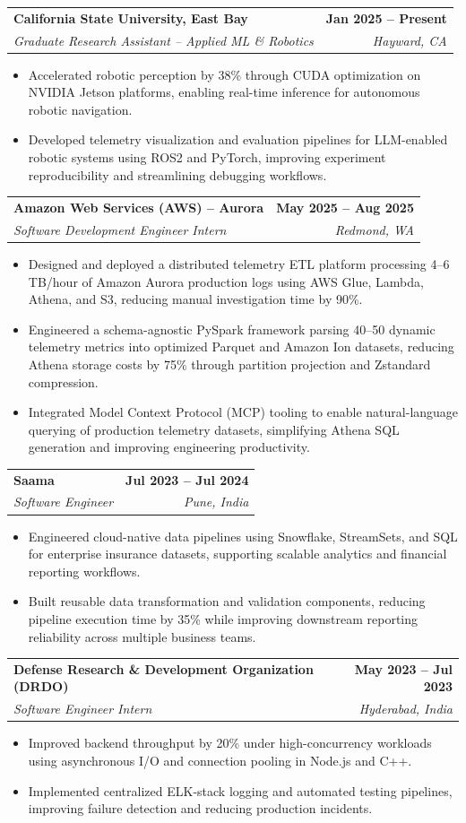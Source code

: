 \documentclass[letterpaper,11pt]{article}
\makeatletter
\newcommand{\subheaderfont}{\fontsize{11.5}{11}\selectfont}
\newcommand{\resumeItem}[1]{
  \item{
    {#1 \vspace{-1pt}}
  }
}
\newcommand{\resumeSubheading}[4]{
  \vspace{1pt}\item
    \begin{tabular*}{1.0\textwidth}[t]{l@{\extracolsep{\fill}}r}
      {\subheaderfont\textbf{#1}} & {\subheaderfont\textbf{#2}} \\
      {\subheaderfont\textit{#3}} & {\subheaderfont\textit{#4}} \\
    \end{tabular*}\vspace{0pt}
}
\newcommand{\resumeItemListStart}{\begin{itemize}}
\newcommand{\resumeItemListEnd}{\end{itemize}\vspace{1pt}}
\makeatother
\begin{document}
    \resumeSubheading
      {California State University, East Bay}{Jan 2025 -- Present}
      {Graduate Research Assistant -- Applied ML \& Robotics}{Hayward, CA}
      \resumeItemListStart
        \resumeItem{Accelerated robotic perception by 38\% through CUDA optimization on NVIDIA Jetson platforms, enabling real-time inference for autonomous robotic navigation.}
        \resumeItem{Developed telemetry visualization and evaluation pipelines for LLM-enabled robotic systems using ROS2 and PyTorch, improving experiment reproducibility and streamlining debugging workflows.}
      \resumeItemListEnd

    \resumeSubheading
      {Amazon Web Services (AWS) -- Aurora}{May 2025 -- Aug 2025}
      {Software Development Engineer Intern}{Redmond, WA}
      \resumeItemListStart
        \resumeItem{Designed and deployed a distributed telemetry ETL platform processing 4--6 TB/hour of Amazon Aurora production logs using AWS Glue, Lambda, Athena, and S3, reducing manual investigation time by 90\%.}
        \resumeItem{Engineered a schema-agnostic PySpark framework parsing 40--50 dynamic telemetry metrics into optimized Parquet and Amazon Ion datasets, reducing Athena storage costs by 75\% through partition projection and Zstandard compression.}
        \resumeItem{Integrated Model Context Protocol (MCP) tooling to enable natural-language querying of production telemetry datasets, simplifying Athena SQL generation and improving engineering productivity.}
      \resumeItemListEnd

    \resumeSubheading
      {Saama}{Jul 2023 -- Jul 2024}
      {Software Engineer}{Pune, India}
      \resumeItemListStart
        \resumeItem{Engineered cloud-native data pipelines using Snowflake, StreamSets, and SQL for enterprise insurance datasets, supporting scalable analytics and financial reporting workflows.}
        \resumeItem{Built reusable data transformation and validation components, reducing pipeline execution time by 35\% while improving downstream reporting reliability across multiple business teams.}
      \resumeItemListEnd

    \resumeSubheading
      {Defense Research \& Development Organization (DRDO)}{May 2023 -- Jul 2023}
      {Software Engineer Intern}{Hyderabad, India}
      \resumeItemListStart
        \resumeItem{Improved backend throughput by 20\% under high-concurrency workloads using asynchronous I/O and connection pooling in Node.js and C++.}
        \resumeItem{Implemented centralized ELK-stack logging and automated testing pipelines, improving failure detection and reducing production incidents.}
      \resumeItemListEnd
\end{document}
